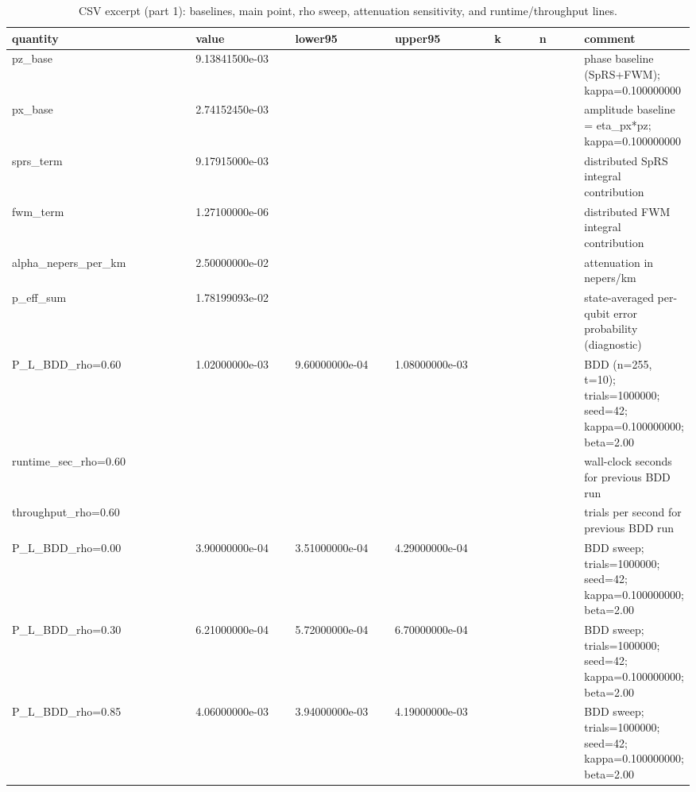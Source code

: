 \documentclass[conference]{IEEEtran}
\newcommand{\simtrials}{1000000}
\newcommand{\simseed}{42}
\newcommand{\simpz}{9.13841500e-03}
\newcommand{\simpx}{2.74152450e-03}
\newcommand{\simpesum}{1.78199093e-02}
\newcommand{\simpLB}{1.02000000e-03}
\newcommand{\simpLBlo}{9.60000000e-04}
\newcommand{\simpLBhi}{1.08000000e-03}
\newcommand{\simkB}{1020}
\newcommand{\simpLD}{3.90000000e-04}
\newcommand{\simpLDlo}{3.51000000e-04}
\newcommand{\simpLDhi}{4.29000000e-04}
\newcommand{\simkD}{390}
\newcommand{\simpLA}{6.21000000e-04}
\newcommand{\simpLAlo}{5.72000000e-04}
\newcommand{\simpLAhi}{6.70000000e-04}
\newcommand{\simkA}{621}
\newcommand{\simpLC}{4.06000000e-03}
\newcommand{\simpLClo}{3.94000000e-03}
\newcommand{\simpLChi}{4.19000000e-03}
\newcommand{\simkC}{4060}
\newcommand{\simThroughput}{35971.22}
\newcommand{\simRuntime}{27.8}
\begin{document}
\begin{table}[t!]
\small
\centering
\caption{CSV excerpt (part 1): baselines, main point, rho sweep, attenuation sensitivity, and runtime/throughput lines.}
\label{tab:csv1}
\begin{adjustbox}{width=\linewidth}
\begin{tabular}{>{\raggedright\arraybackslash}p{0.30\linewidth} >{\raggedright\arraybackslash}p{0.16\linewidth} >{\raggedright\arraybackslash}p{0.16\linewidth} >{\raggedright\arraybackslash}p{0.16\linewidth} >{\raggedright\arraybackslash}p{0.08\linewidth} >{\raggedright\arraybackslash}p{0.08\linewidth} >{\raggedright\arraybackslash}p{0.34\linewidth}}
\toprule
quantity & value & lower95 & upper95 & k & n & comment \\
\midrule
pz\_base & \simpz &  &  &  &  & phase baseline (SpRS+FWM); kappa=0.100000000 \\
px\_base & \simpx &  &  &  &  & amplitude baseline = eta\_px*pz; kappa=0.100000000 \\
sprs\_term & 9.17915000e-03 &  &  &  &  & distributed SpRS integral contribution \\
fwm\_term & 1.27100000e-06 &  &  &  &  & distributed FWM integral contribution \\
alpha\_nepers\_per\_km & 2.50000000e-02 &  &  &  &  & attenuation in nepers/km \\
p\_eff\_sum & \simpesum &  &  &  &  & state-averaged per-qubit error probability (diagnostic) \\
P\_L\_BDD\_rho=0.60 & \simpLB & \simpLBlo & \simpLBhi & \simkB & \simtrials & BDD (n=255, t=10); trials=\simtrials; seed=\simseed; kappa=0.100000000; beta=2.00 \\
runtime\_sec\_rho=0.60 & \simRuntime &  &  &  &  & wall-clock seconds for previous BDD run \\
throughput\_rho=0.60 & \simThroughput &  &  &  &  & trials per second for previous BDD run \\
P\_L\_BDD\_rho=0.00 & \simpLD & \simpLDlo & \simpLDhi & \simkD & \simtrials & BDD sweep; trials=\simtrials; seed=\simseed; kappa=0.100000000; beta=2.00 \\
P\_L\_BDD\_rho=0.30 & \simpLA & \simpLAlo & \simpLAhi & \simkA & \simtrials & BDD sweep; trials=\simtrials; seed=\simseed; kappa=0.100000000; beta=2.00 \\
P\_L\_BDD\_rho=0.85 & \simpLC & \simpLClo & \simpLChi & \simkC & \simtrials & BDD sweep; trials=\simtrials; seed=\simseed; kappa=0.100000000; beta=2.00 \\

\end{tabular}
\end{adjustbox}
\end{table}
\end{document}
